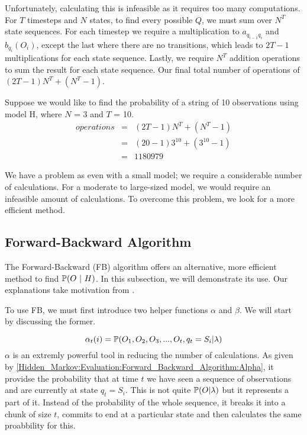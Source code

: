 Unfortunately, calculating this is infeasible as it requires too many computations. For $T$ timesteps and $N$ states, to find every possible $Q$, we must sum over $N^T$ state sequences. For each timestep we require a multiplication to $a_{q_{i-1}q_{i}}$ and $b_{q_i}(O_i)$, except the last where there are no transitions, which leads to $2T-1$ multiplications for each state sequence. Lastly, we require $N^T$ addition operations to sum the result for each state sequence. Our final total number of operations of $(2T-1)N^T + (N^T-1)$. 

\begin{example}
    \label{Hidden_Markov:Evaluation:motivfb}
    Suppose we would like to find the probability of a string of 10 observations using model H, where $N$ = 3 and $T$ = 10. 
    \begin{eqnarray}
        operations & = & (2T-1)N^T + (N^T-1) \\
                   & = & (20-1)3^10 + (3^10 -1) \\
                   & = & 1180979
    \end{eqnarray}
\end{example}


We have a problem as even with a small model; we require a considerable number of calculations. For a moderate to large-sized model, we would require an infeasible amount of calculations. To overcome this problem, we look for a more efficient method.



    \subsection{Forward-Backward Algorithm}
    \label{Hidden_Markov:Evaluation:Forward_Backward_Algorithm}

    The Forward-Backward (FB) algorithm offers an alternative, more efficient method to find $\prob (O \ | \ H)$. In this subsection, we will demonstrate its use. Our explanations take motivation from \cite{Rabiner1986}.

    To use FB, we must first introduce two helper functions $\alpha$ and $\beta$. We will start by discussing the former. 

    \begin{equation}
        \label{Hidden_Markov:Evaluation:Forward_Backward_Algorithm:Alpha}
        \alpha_t(i) = \mathbb{P} (O_1,O_2,O_3,...,O_t,q_t=S_i | \lambda)
    \end{equation}
    $\alpha$ is an extremly powerful tool in reducing the number of calculations. As given by \ref{Hidden_Markov:Evaluation:Forward_Backward_Algorithm:Alpha}, it providse the probability that at time $t$ we have seen a sequence of observations and are currently at state $q_t=S_i$. This is not quite $\mathbb{P} (O | \lambda)$ but it represents a part of it. Instead of the probability of the whole sequence, it breaks it into a chunk of size $t$, commits to end at a particular state and then calculates the same proabbility for this.

